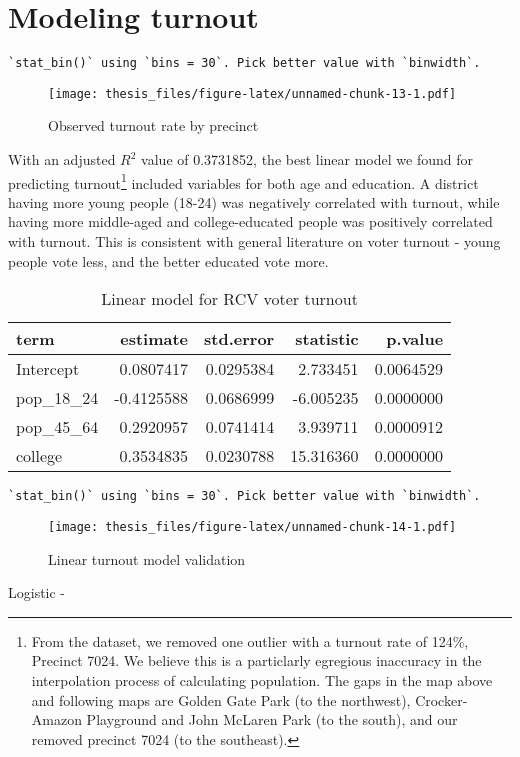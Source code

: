 \documentclass[12pt,twoside]{reedthesis}
\begin{document}
\hypertarget{modeling-turnout}{%
\section{Modeling turnout}\label{modeling-turnout}}
\begin{verbatim}
`stat_bin()` using `bins = 30`. Pick better value with `binwidth`.
\end{verbatim}
\begin{figure}
\centering
\texttt{[image: thesis\_files/figure-latex/unnamed-chunk-13-1.pdf]}
\caption{\label{fig:unnamed-chunk-13}Observed turnout rate by precinct}
\end{figure}
With an adjusted \(R^2\) value of 0.3731852, the best linear model we found for predicting turnout\footnote{From the dataset, we removed one outlier with a turnout rate of 124\%, Precinct 7024. We believe this is a particlarly egregious inaccuracy in the interpolation process of calculating population. The gaps in the map above and following maps are Golden Gate Park (to the northwest), Crocker-Amazon Playground and John McLaren Park (to the south), and our removed precinct 7024 (to the southeast).} included variables for both age and education. A district having more young people (18-24) was negatively correlated with turnout, while having more middle-aged and college-educated people was positively correlated with turnout. This is consistent with general literature on voter turnout - young people vote less, and the better educated vote more.
\begin{longtable}{lrrrr}
\caption[Linear turnout model]{\label{tab:unnamed-chunk-14}Linear model for RCV voter turnout}\\
\toprule
term & estimate & std.error & statistic & p.value\\
\midrule
Intercept & 0.0807417 & 0.0295384 & 2.733451 & 0.0064529\\
pop\_18\_24 & -0.4125588 & 0.0686999 & -6.005235 & 0.0000000\\
pop\_45\_64 & 0.2920957 & 0.0741414 & 3.939711 & 0.0000912\\
college & 0.3534835 & 0.0230788 & 15.316360 & 0.0000000\\
\bottomrule
\end{longtable}
\begin{verbatim}
`stat_bin()` using `bins = 30`. Pick better value with `binwidth`.
\end{verbatim}
\begin{figure}
\centering
\texttt{[image: thesis\_files/figure-latex/unnamed-chunk-14-1.pdf]}
\caption{\label{fig:unnamed-chunk-14}Linear turnout model validation}
\end{figure}
Logistic -
\end{document}
